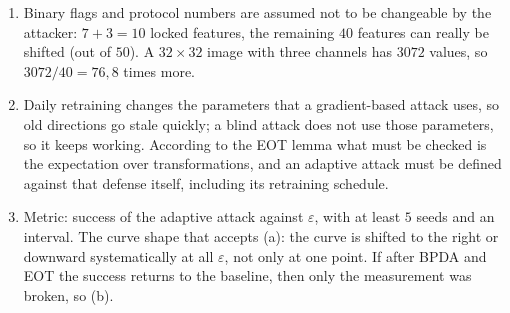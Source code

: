 \begin{enumerate}[label=\textbf{30.\arabic*}]
  \item Binary flags and protocol numbers are assumed not to be changeable by the attacker:
        $7+3=10$ locked features, the remaining $40$ features can really be shifted (out of
        $50$). A $32\times32$ image with three channels has $3072$ values, so
        $3072/40=76{,}8$ times more.

  \item Daily retraining changes the parameters that a gradient-based attack uses,
        so old directions go stale quickly; a blind attack does not use those parameters, so
        it keeps working. According to the EOT lemma what must be checked is the expectation over
        transformations, and an adaptive attack must be defined against that defense
        itself, including its retraining schedule.

  \item Metric: success of the adaptive attack against $\varepsilon$, with
        at least $5$ seeds and an interval. The curve shape that accepts (a): the curve
        is shifted to the right or downward systematically at all $\varepsilon$,
        not only at one point. If after BPDA and EOT the success returns
        to the baseline, then only the measurement was broken, so (b).
\end{enumerate}

